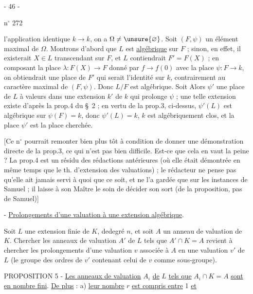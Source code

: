 \begin{center}- 46 -\end{center}
\hfill n$^\circ$ 272

l'application identique $k\longrightarrow k$, on a $\Omega\ne\unsure{\varnothing}$. Soit $(F,\psi)$ un élément maximal de $\Omega$. Montrons d'abord que $L$ est \uline{algébrique} sur $F$ ; sinon, en effet, il existerait $X\in L$ transcendant sur $F$, et $L$ contiendrait $F'=F(X)$ ; en composant la place $\lambda:F(X)\longrightarrow F$ donné par $f\longrightarrow f(0)$ avec la place $\psi:F\longrightarrow k$, on obtiendrait une place de $F'$ qui serait l'identité sur $k$, contrairement au caractère maximal de $(F,\psi)$. Donc $L/F$ est algébrique. Soit Alors $\psi'$ une place de $L$ à valeurs dans une extension $k'$ de $k$ qui prolonge $\psi$ ; une telle extension existe d'après la prop.4 du \S\ 2 ; en vertu de la prop.3, ci-dessus, $\psi'(L)$ est algébrique sur $\psi(F)=k$, donc $\psi'(L)=k$,  $k$ est algébriquement clos, et la place $\psi'$ est la place cherchée.

[Ce n$^\circ$ pourrait remonter bien plus tôt à condition de donner une démonstration directe de la prop.3, ce qui n'est pas bien difficile. Est-ce que cela en vaut la peine ? La prop.4 est un résidu des rédactions antérieures (où elle était démontrée en même temps que le th. d'extension des valuations) ; le rédacteur ne pense pas qu'elle ait jamais servi à quoi que ce soit, et ne l'a gardée que sur les instances de Samuel ; il laisse à son Maître le soin de décider son sort (de la proposition, pas de Samuel)]

 - \uline{Prolongements d'une valuation à une extension algébrique}.

Soit $L$ une extension finie de $K$, dedegré $n$, et soit $A$ un anneau de valuation de $K$. Chercher les anneaux de valuation $A'$ de $L$ tels que $A'\cap K=A$ revient à chercher les prolongements d'une valuation $v$ associée à $A$ en une valuation $v'$ de $L$ (le groupe des ordres de $v'$ contenant celui de $v$ comme sous-groupe).

PROPOSITION 5 - \uline{Les anneaux de valuation} $A_i$ \uline{de} $L$ \uline{tels que} $A_i\cap K=A$ \uline{sont en nombre fini}. \uline{De plus} : a) \uline{leur nombre} $r$ \uline{est compris entre} 1 \uline{et}
